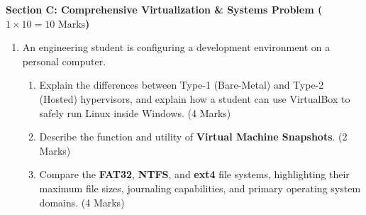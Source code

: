 \begin{chaptertest}
\medskip
\noindent\textbf{Section C: Comprehensive Virtualization \& Systems Problem ($1 \times 10 = 10\text{ Marks}$)}
\begin{enumerate}[leftmargin=1.5em, start=8]
    \item An engineering student is configuring a development environment on a personal computer.
    \begin{enumerate}[label=(\alph*)]
        \item Explain the differences between Type-1 (Bare-Metal) and Type-2 (Hosted) hypervisors, and explain how a student can use VirtualBox to safely run Linux inside Windows. (4 Marks)
        \item Describe the function and utility of \textbf{Virtual Machine Snapshots}. (2 Marks)
        \item Compare the \textbf{FAT32}, \textbf{NTFS}, and \textbf{ext4} file systems, highlighting their maximum file sizes, journaling capabilities, and primary operating system domains. (4 Marks)
    \end{enumerate}
\end{enumerate}
\end{chaptertest}

